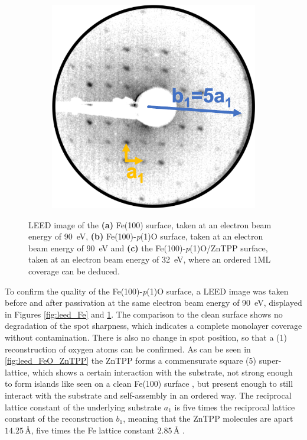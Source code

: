 \begin{figure}[h]
\begin{subfigure}{0.25\textwidth}
        \caption{}
        \label{fig:leed_FeO}
    \end{subfigure}
    \hfill
    \begin{subfigure}{0.25\textwidth}
        \includegraphics[width = \textwidth]{Plots/FeO_ZnTPP.png}
        \caption{}
        \label{fig:leed_FeO_ZnTPP}
    \end{subfigure}
    \caption{LEED image of the \textbf{(a)} Fe(100) surface, taken at an electron beam energy of \qty{90}{eV}, \textbf{(b)} Fe(100)-\textit{p}(1)O surface, taken at an electron beam energy of \qty{90}{eV} and \textbf{(c)} the Fe(100)-\textit{p}(1)O/ZnTPP surface, taken at an electron beam energy of \qty{32}{eV}, where an ordered 1ML coverage can be deduced.}
    \label{fig:leed_1}
\end{figure}
\FloatBarrier

To confirm the quality of the Fe(100)-\textit{p}(1)O surface, a LEED image was taken before and after passivation at the same electron beam energy of \qty{90}{eV}, displayed in Figures \ref{fig:leed_Fe} and \ref{fig:leed_FeO}.
The comparison to the clean surface shows no degradation of the spot sharpness, which indicates a complete monolayer coverage without contamination.
There is also no change in spot position, so that a (1) reconstruction of oxygen atoms can be confirmed.
As can be seen in \autoref{fig:leed_FeO_ZnTPP} the ZnTPP forms a commensurate square (5) super-lattice, which shows a certain interaction with the substrate, not strong enough to form islands like seen on a clean Fe(100) surface \cite*{bussetti_structure_2016}, but present enough to still interact with the substrate and self-assembly in an ordered way.
The reciprocal lattice constant of the underlying substrate $a_1$ is five times the reciprocal lattice constant of the reconstruction $b_1$, meaning that the ZnTPP molecules are apart $14.25\,$\r{A}, five times the Fe lattice constant $2.85\,$\r{A} \cite*{davey_precision_1925}.

